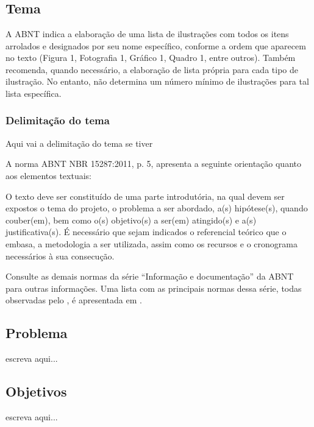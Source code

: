 \chapter*[]{}

\section{Tema}

A ABNT indica a elaboração de uma lista de ilustrações com todos os itens arrolados e designados por seu nome específico, conforme a ordem que aparecem no texto (Figura 1, Fotografia 1, Gráfico 1, Quadro 1, entre outros). Também recomenda, quando necessário, a elaboração de lista própria para cada tipo de ilustração. No entanto, não determina um número mínimo de ilustrações para tal lista específica.

\subsection{Delimitação do tema}
Aqui vai a delimitação do tema se tiver


A norma ABNT NBR 15287:2011, p. 5, apresenta a
seguinte orientação quanto aos elementos textuais:

\begin{citacao}
	O texto deve ser constituído de uma parte introdutória, na qual devem ser
	expostos o tema do projeto, o problema a ser abordado, a(s) hipótese(s),
	quando couber(em), bem como o(s) objetivo(s) a ser(em) atingido(s) e a(s)
	justificativa(s). É necessário que sejam indicados o referencial teórico que
	o embasa, a metodologia a ser utilizada, assim como os recursos e o cronograma
	necessários à sua consecução.
\end{citacao}

Consulte as demais normas da série ``Informação e documentação'' da ABNT
para outras informações. Uma lista com as principais normas dessa série, todas
observadas pelo \abnTeX, é apresentada em .

\section{Problema}
escreva aqui...


\section{Objetivos}
escreva aqui...

